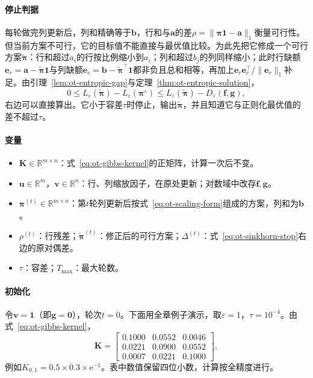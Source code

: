 \paragraph{停止判据}
每轮做完列更新后，列和精确等于$\bm{b}$，行和与$\bm{a}$的差$\rho=\lVert\bm{\pi}\bm{1}-\bm{a}\rVert_1$衡量可行性。但当前方案不可行，它的目标值不能直接与最优值比较。为此先把它修成一个可行方案$\tilde{\bm{\pi}}$：行和超过$a_i$的行按比例缩小到$a_i$；列和超过$b_j$的列同样缩小；此时行缺额$\bm{e}_r=\bm{a}-\tilde{\bm{\pi}}\bm{1}$与列缺额$\bm{e}_c=\bm{b}-\tilde{\bm{\pi}}^{\top}\bm{1}$都非负且总和相等，再加上$\bm{e}_r\bm{e}_c^{\top}/\lVert\bm{e}_r\rVert_1$补足。由引理~\ref{lem:ot-entropic-gap}与定理~\ref{thm:ot-entropic-solution}，
\begin{equation}
 0\leq L_\varepsilon(\tilde{\bm{\pi}})-L_\varepsilon(\bm{\pi}^{\varepsilon})\leq L_\varepsilon(\tilde{\bm{\pi}})-D_\varepsilon(\bm{f},\bm{g}),
 \label{eq:ot-sinkhorn-stop}
\end{equation}
右边可以直接算出。它小于容差$\tau$时停止，输出$\tilde{\bm{\pi}}$，并且知道它与正则化最优值的差不超过$\tau$。

\paragraph{变量}
\begin{itemize}
 \item $\bm{K}\in\mathbb{R}^{m\times n}$：式~\eqref{eq:ot-gibbs-kernel}的正矩阵，计算一次后不变。
 \item $\bm{u}\in\mathbb{R}^{m}$，$\bm{v}\in\mathbb{R}^{n}$：行、列缩放因子，在原处更新；对数域中改存$\bm{f},\bm{g}$。
 \item $\bm{\pi}^{(t)}\in\mathbb{R}^{m\times n}$：第$t$轮列更新后按式~\eqref{eq:ot-scaling-form}组成的方案，列和为$\bm{b}$。
 \item $\rho^{(t)}$：行残差；$\tilde{\bm{\pi}}^{(t)}$：修正后的可行方案；$\Delta^{(t)}$：式~\eqref{eq:ot-sinkhorn-stop}右边的原对偶差。
 \item $\tau$：容差；$T_{\max}$：最大轮数。
\end{itemize}

\paragraph{初始化}
令$\bm{v}=\bm{1}$（即$\bm{g}=\bm{0}$），轮次$t=0$。下面用全章例子演示，取$\varepsilon=1$，$\tau=10^{-4}$。由式~\eqref{eq:ot-gibbs-kernel}，
\[
 \bm{K}=\begin{bmatrix}0.1000&0.0552&0.0046\\0.0221&0.0900&0.0552\\0.0007&0.0221&0.1000\end{bmatrix},
\]
例如$K_{0,1}=0.5\times0.3\times\mathrm{e}^{-1}$。表中数值保留四位小数，计算按全精度进行。

